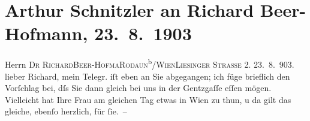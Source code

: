 

         
         \renewcommand{\erwaehntePersonen}{Personen: Richard Beer-Hofmann, Paula Beer-Hofmann, Louise Schnitzler, Olga Schnitzler}
         \renewcommand{\erwaehnteOrte}{Orte: Gentzgasse, IX., Alsergrund, Liesingerstraße, Meran, Palast Hotel Lido, Riva del Garda, Rodaun, Wien}
         \renewcommand{\erwaehnteWerke}{}
               \section[Arthur Schnitzler an Richard Beer-Hofmann, 23. 8. 1903]{ Arthur Schnitzler an Richard Beer-Hofmann, 23. 8. 1903}\nopagebreak{}\rehead{ }\begin{ledgroupsized}[t]{13cm}\normalsize\beginnumbering{} \toendnotes[C]{\smallbreak\pagebreak[2]} 
\toendnotes[C]{\smallbreak}\pstart{}{\pb}Herrn \textsc{Dr Richard}\pend{}\pstart{}\textsc{Beer-Hofma{\geminationn}}\pend{}\pstart{}\textsc{Rodaun}\textsuperscript{b}/\textsc{Wien}\pend{}\pstart{}\textsc{Liesinger Straße 2.}\pend{}{\bigskip}\pstart
           \raggedleft{}{\pb}23. 8. 903. \pend
           \pstart
           lieber Richard, mein Telegr. iſt eben an Sie abgegangen; ich füge
               brieflich den Vorſchlag bei, dſs Sie dann gleich bei uns in der Gentzgaſſe eſſen mögen. Vielleicht hat Ihre Frau am gleichen Tag etwas in Wien zu thun, u da{\geminationn}
               gilt das gleiche, ebenſo herzlich, für ſie. –\pend
           \pstart

\end{ledgroupsized}
